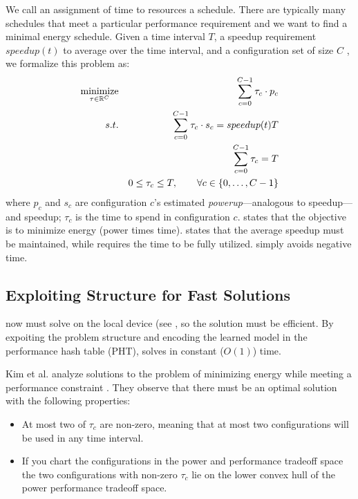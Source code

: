 We call an assignment of time to resources a schedule. There are
typically many schedules that meet a particular performance
requirement and we want to find a minimal energy schedule. Given a
time interval $T$, a speedup requirement $speedup(t)$ to average over
the time interval, and a configuration set of size $C$ , we formalize
this problem as:
\begin{eqnarray}
  \minimize_{\mathbf{\tau} \in \R^{C}} && \sum_{c=0}^{C-1} \tau_c \cdot p_c \label{eqn:power}  \\
  \st %
  && \sum_{c=0}^{C-1} \tau_c \cdot s_c =  speedup(t)T \label{eqn:work} \\
  && \sum_{c=0}^{C-1} \tau_c =  T \label{eqn:deadline} \\
  && 0 \le \tau_c \le T, \qquad \forall c \in \{0,\ldots,C-1\} \label{eqn:time}
\end{eqnarray}
where $p_c$ and $s_c$ are configuration $c$'s estimated
\emph{powerup}---analogous to speedup---and speedup; $\tau_c$ is the
time to spend in configuration $c$.   states that the
objective is to minimize energy (power times time).  
states that the average speedup must be maintained, while
 requires the time to be fully utilized.
 simply avoids negative time.

\subsection{Exploiting Structure for Fast Solutions}
\SYSTEM{} now must solve  on the local device
(see , so the solution must be efficient.  By
expoiting the problem structure and encoding the learned model in the
performance hash table (PHT), \SYSTEM{} solves 
in constant ($O(1)$) time.

Kim et al. analyze solutions to the problem of minimizing energy while
meeting a performance constraint \cite{kim-cpsna}.  They observe that
there must be an optimal solution with the following properties:
\begin{itemize}
\item At most two of $\tau_c$ are non-zero, meaning that at most two
  configurations will be used in any time interval.
\item If you chart the configurations in the power and performance
  tradeoff space the two configurations with non-zero $\tau_c$ lie on
  the lower convex hull of the power performance tradeoff space.
\end{itemize}

